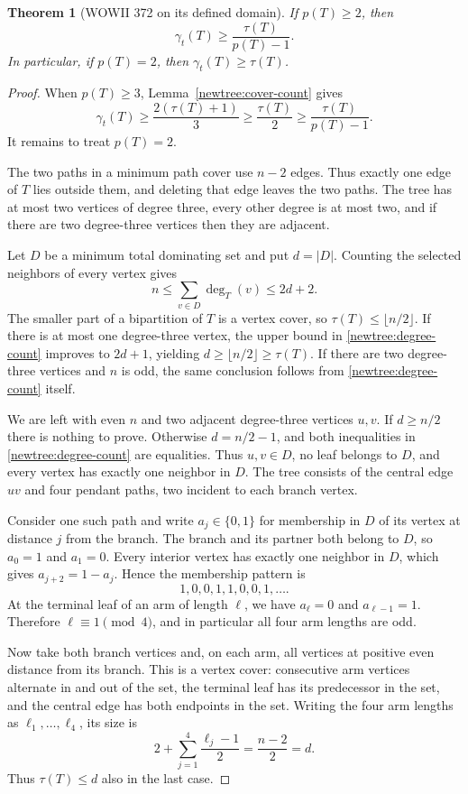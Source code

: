 \documentclass[11pt,a4paper]{article}
\newtheorem{theorem}{Theorem}[section]
\theoremstyle{remark}
\begin{document}
\begin{theorem}[WOWII 372 on its defined domain]\label{newtree:372}
If $p(T)\geq2$, then
\[
 \gamma_t(T)\geq\frac{\tau(T)}{p(T)-1}.
\]
In particular, if $p(T)=2$, then $\gamma_t(T)\geq\tau(T)$.
\end{theorem}
\begin{proof}
When $p(T)\geq3$, Lemma~\ref{newtree:cover-count} gives
\[
 \gamma_t(T)\geq\frac{2(\tau(T)+1)}3
                \geq\frac{\tau(T)}2
                \geq\frac{\tau(T)}{p(T)-1}.
\]
It remains to treat $p(T)=2$.

The two paths in a minimum path cover use $n-2$ edges.  Thus exactly one
edge of $T$ lies outside them, and deleting that edge leaves the two
paths.  The tree has at most two vertices of degree three, every other
degree is at most two, and if there are two degree-three vertices then
they are adjacent.

Let $D$ be a minimum total dominating set and put $d=|D|$.  Counting the
selected neighbors of every vertex gives
\begin{equation}\label{newtree:degree-count}
 n\leq\sum_{v\in D}\deg_T(v)\leq2d+2.
\end{equation}
The smaller part of a bipartition of $T$ is a vertex cover, so
$\tau(T)\leq\lfloor n/2\rfloor$.  If there is at most one degree-three
vertex, the upper bound in \eqref{newtree:degree-count} improves to
$2d+1$, yielding $d\geq\lfloor n/2\rfloor\geq\tau(T)$.  If there are
two degree-three vertices and $n$ is odd, the same conclusion follows
from \eqref{newtree:degree-count} itself.

We are left with even $n$ and two adjacent degree-three vertices $u,v$.
If $d\geq n/2$ there is nothing to prove.  Otherwise
$d=n/2-1$, and both inequalities in \eqref{newtree:degree-count} are
equalities.  Thus $u,v\in D$, no leaf belongs to $D$, and every vertex
has exactly one neighbor in $D$.  The tree consists of the central edge
$uv$ and four pendant paths, two incident to each branch vertex.

Consider one such path and write $a_j\in\{0,1\}$ for membership in $D$
of its vertex at distance $j$ from the branch.  The branch and its partner
both belong to $D$, so $a_0=1$ and $a_1=0$.  Every interior vertex has
exactly one neighbor in $D$, which gives $a_{j+2}=1-a_j$.  Hence the
membership pattern is
\[
 1,0,0,1,1,0,0,1,\ldots.
\]
At the terminal leaf of an arm of length $\ell$, we have $a_\ell=0$ and
$a_{\ell-1}=1$.  Therefore $\ell\equiv1\pmod4$, and in particular all
four arm lengths are odd.

Now take both branch vertices and, on each arm, all vertices at positive
even distance from its branch.  This is a vertex cover: consecutive arm
vertices alternate in and out of the set, the terminal leaf has its
predecessor in the set, and the central edge has both endpoints in the
set.  Writing the four arm lengths as $\ell_1,\ldots,\ell_4$, its size is
\[
 2+\sum_{j=1}^4\frac{\ell_j-1}{2}
 =\frac{n-2}{2}=d.
\]
Thus $\tau(T)\leq d$ also in the last case.
\end{proof}
\end{document}
